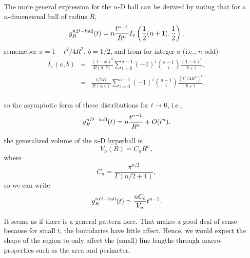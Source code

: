 \documentclass{article}
\begin{document}


The more general expression for the $n$-D ball can be derived by
noting that for a $n$-dimensional ball of radius $R$,
\begin{equation}
 g^{nD-{\rm ball}}_R(t) = n \frac{t^{n-1}}{R^n} I_x\left( 
  \frac{1}{2} (n+1), \frac{1}{2}
                      \right),
\end{equation}
rememeber $x = 1 - t^2/4R^2$, $b=1/2$, and from
\cite[26.5.6]{Abramowitz_and_Stegun} for integer $a$ (i.e., $n$ odd) 
\begin{eqnarray}
  \label{eq:Ix}
  I_x(a,b) & = & \frac{(1 -x)^b}{B(a,b)}
                 \sum_{i=0}^{a-1} (-1)^i \binom{a-1}{i} \frac{(1-x)^i}{b+i},
                    \nonumber \\
 & = & \frac{t/2R}{B(a,b)}
                 \sum_{i=0}^{a-1} (-1)^i \binom{a-1}{i} \frac{(t^2/4R^4)^i}{b+i},
                    \nonumber \\
\end{eqnarray}


so  the asymptotic form of these distributions for $t
\rightarrow 0$, i.e., 
\begin{equation}
  \label{eq:asympt_line_picking}
  g^{nD-{\rm ball}}_R(t) = n \frac{t^{n-1}}{R^n} + O(t^{n}).
\end{equation}

the generalized volume of the $n$-D hyperball is
\[ V_n(R) = C_n R^n, \]
where
\begin{equation}
  \label{eq:cn}
   C_n = \frac{ \pi^{n/2} }{\Gamma(n/2 + 1)},
\end{equation}
so we can write
\begin{equation}
  \label{eq:asympt_line_picking}
  g^{nD-{\rm ball}}_R(t) \simeq  \frac{n C_b}{V_n} t^{n-1}.
\end{equation}









It seems as if there is a general pattern here.  That makes a good
deal of sense because for small $t$, the boundaries have little
affect. Hence, we would expect the shape of the region to only affect
the (small) line lengths through macro-properties such as the area and
perimeter.
\end{document}
